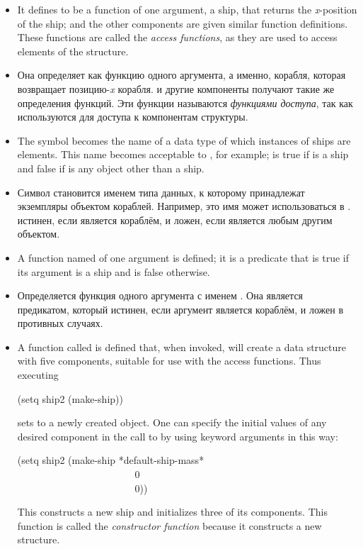 \begin{itemize}
\item
It defines  to be a function
of one argument, a ship, that returns the \emph{x}-position
of the ship; 
and the other components are given similar function definitions.
These functions are called the \emph{access functions}, as they
are used to access elements of the structure.

\item 
Она определяет  как функцию одного аргумента, а именно,
корабля, которая возвращает позицию-\emph{x} корабля.
 и другие компоненты получают такие же определения функций.
Эти функции называются \emph{функциями доступа}, так как используются для
доступа к компонентам структуры.

\item
The symbol  becomes the name of a data type of which instances
of ships are elements.  This name becomes acceptable to ,
for example;  is true if  is a ship
and false if  is any object other than a ship.

\item 
Символ  становится именем типа данных, к которому принадлежат
экземпляры объектом кораблей. Например, это имя может использоваться в
.
 истинен, если  является кораблём, и ложен, если
 является любым другим объектом.

\item
A function named  of one argument is defined; it is a predicate
that is true if its argument is a ship and is false otherwise.

\item 
Определяется функция одного аргумента с именем . Она является
предикатом, который истинен, если аргумент является кораблём, и ложен в
противных случаях. 

\item
A function called  is defined that, when invoked,
will create a data structure with five components, suitable for use with
the access functions.  Thus executing
\begin{lisp}
(setq ship2 (make-ship))
\end{lisp}
sets  to a newly created  object.
One can specify the initial values of any desired component in the call
to  by using keyword arguments in this way:
\begin{lisp}
(setq ship2 (make-ship  *default-ship-mass* \\
~~~~~~~~~~~~~~~~~~~~~~~ 0 \\
~~~~~~~~~~~~~~~~~~~~~~~ 0))
\end{lisp}
This constructs a new ship and initializes three of its components.
This function is called the \emph{constructor function}
because it constructs a new structure.


\end{itemize}
